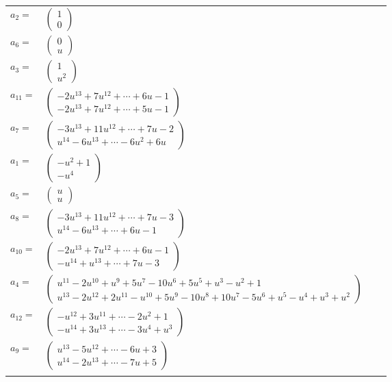 \documentclass[1p]{elsarticle_modified}
\theoremstyle{definition}
\begin{document}
\begin{tabular}{m{7pt} m{180pt} m{7pt} m{180pt} }
\flushright $a_{2}=$&$\begin{pmatrix}1\\0\end{pmatrix}$ \\
\flushright $a_{6}=$&$\begin{pmatrix}0\\u\end{pmatrix}$ \\
\flushright $a_{3}=$&$\begin{pmatrix}1\\u^2\end{pmatrix}$ \\
\flushright $a_{11}=$&$\begin{pmatrix}-2 u^{13}+7 u^{12}+\cdots+6 u-1\\-2 u^{13}+7 u^{12}+\cdots+5 u-1\end{pmatrix}$ \\
\flushright $a_{7}=$&$\begin{pmatrix}-3 u^{13}+11 u^{12}+\cdots+7 u-2\\u^{14}-6 u^{13}+\cdots-6 u^2+6 u\end{pmatrix}$ \\
\flushright $a_{1}=$&$\begin{pmatrix}- u^2+1\\- u^4\end{pmatrix}$ \\
\flushright $a_{5}=$&$\begin{pmatrix}u\\u\end{pmatrix}$ \\
\flushright $a_{8}=$&$\begin{pmatrix}-3 u^{13}+11 u^{12}+\cdots+7 u-3\\u^{14}-6 u^{13}+\cdots+6 u-1\end{pmatrix}$ \\
\flushright $a_{10}=$&$\begin{pmatrix}-2 u^{13}+7 u^{12}+\cdots+6 u-1\\- u^{14}+u^{13}+\cdots+7 u-3\end{pmatrix}$ \\
\flushright $a_{4}=$&$\begin{pmatrix}u^{11}-2 u^{10}+u^9+5 u^7-10 u^6+5 u^5+u^3- u^2+1\\u^{13}-2 u^{12}+2 u^{11}- u^{10}+5 u^9-10 u^8+10 u^7-5 u^6+u^5- u^4+u^3+u^2\end{pmatrix}$ \\
\flushright $a_{12}=$&$\begin{pmatrix}- u^{12}+3 u^{11}+\cdots-2 u^2+1\\- u^{14}+3 u^{13}+\cdots-3 u^4+u^3\end{pmatrix}$ \\
\flushright $a_{9}=$&$\begin{pmatrix}u^{13}-5 u^{12}+\cdots-6 u+3\\u^{14}-2 u^{13}+\cdots-7 u+5\end{pmatrix}$\\&\end{tabular}
\end{document}
